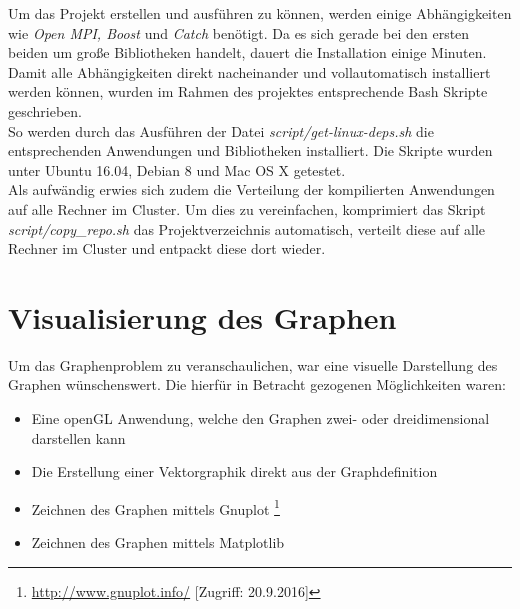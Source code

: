 \documentclass[12pt,a4paper]{scrreprt}
\newcommand{\absatz}{\\[12pt]}
\begin{document}
Um das Projekt erstellen und ausführen zu können, werden einige Abhängigkeiten wie \textit{Open MPI, Boost} und \textit{Catch} benötigt. 
Da es sich gerade bei den ersten beiden um große Bibliotheken handelt, dauert die Installation einige Minuten. Damit alle Abhängigkeiten direkt nacheinander und vollautomatisch installiert werden können, wurden im Rahmen des projektes entsprechende Bash Skripte geschrieben.\\
So werden durch das Ausführen der Datei \textit{script/get-linux-deps.sh} die entsprechenden Anwendungen und Bibliotheken installiert. Die Skripte wurden unter Ubuntu 16.04, Debian 8 und Mac OS X getestet.\absatz
Als aufwändig erwies sich zudem die Verteilung der kompilierten Anwendungen auf alle Rechner im Cluster. Um dies zu vereinfachen, komprimiert das  Skript \textit{script/copy\_repo.sh} das Projektverzeichnis automatisch, verteilt diese auf alle Rechner im Cluster und entpackt diese dort wieder.

\section{Visualisierung des Graphen}
\label{sec:visualisierung_graph}

Um das Graphenproblem zu veranschaulichen, war eine visuelle Darstellung des Graphen wünschenswert. Die hierfür in Betracht gezogenen Möglichkeiten waren:

\begin{itemize}
\item Eine openGL Anwendung, welche den Graphen zwei- oder dreidimensional darstellen kann
\item Die Erstellung einer Vektorgraphik direkt aus der Graphdefinition
\item Zeichnen des Graphen mittels Gnuplot \footnote{\url{http://www.gnuplot.info/} [Zugriff: 20.9.2016]}
\item Zeichnen des Graphen mittels Matplotlib
\end{itemize}
\end{document}
